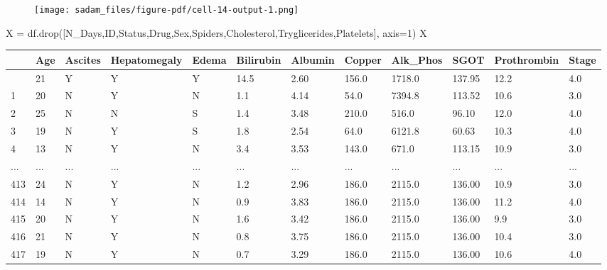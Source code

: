 \documentclass[
  letterpaper,
]{krantz}
\makeatletter
\newenvironment{Shaded}{\begin{snugshade}}{\end{snugshade}}
\newcommand{\DecValTok}[1]{\textcolor[rgb]{0.68,0.00,0.00}{#1}}
\newcommand{\NormalTok}[1]{\textcolor[rgb]{0.00,0.23,0.31}{#1}}
\newcommand{\OperatorTok}[1]{\textcolor[rgb]{0.37,0.37,0.37}{#1}}
\newcommand{\StringTok}[1]{\textcolor[rgb]{0.13,0.47,0.30}{#1}}
\newenvironment{kframe}{%
\medskip{}
\setlength{\fboxsep}{.8em}
 \def\at@end@of@kframe{}%
 \ifinner\ifhmode%
  \def\at@end@of@kframe{\end{minipage}}%
  \begin{minipage}{\columnwidth}%
 \fi\fi%
 \def\FrameCommand##1{\hskip\@totalleftmargin \hskip-\fboxsep
 \colorbox{shadecolor}{##1}\hskip-\fboxsep
     \hskip-\linewidth \hskip-\@totalleftmargin \hskip\columnwidth}%
 \MakeFramed {\advance\hsize-\width
   \@totalleftmargin\z@ \linewidth\hsize
   \@setminipage}}%
 {\par\unskip\endMakeFramed%
 \at@end@of@kframe}
\renewenvironment{Shaded}{\begin{kframe}}{\end{kframe}}
\makeatother
\begin{document}
\begin{figure}[H]

{\centering \texttt{[image: sadam\_files/figure-pdf/cell-14-output-1.png]}

}

\end{figure}

\begin{Shaded}
\begin{Highlighting}[]
\NormalTok{X }\OperatorTok{=}\NormalTok{ df.drop([}\StringTok{\textquotesingle{}N\_Days\textquotesingle{}}\NormalTok{,}\StringTok{\textquotesingle{}ID\textquotesingle{}}\NormalTok{,}\StringTok{\textquotesingle{}Status\textquotesingle{}}\NormalTok{,}\StringTok{\textquotesingle{}Drug\textquotesingle{}}\NormalTok{,}\StringTok{\textquotesingle{}Sex\textquotesingle{}}\NormalTok{,}\StringTok{\textquotesingle{}Spiders\textquotesingle{}}\NormalTok{,}\StringTok{\textquotesingle{}Cholesterol\textquotesingle{}}\NormalTok{,}\StringTok{\textquotesingle{}Tryglicerides\textquotesingle{}}\NormalTok{,}\StringTok{\textquotesingle{}Platelets\textquotesingle{}}\NormalTok{], axis}\OperatorTok{=}\DecValTok{1}\NormalTok{)}
\NormalTok{X}
\end{Highlighting}
\end{Shaded}

\begin{longtable}[]{@{}llllllllllll@{}}
\toprule\noalign{}
& Age & Ascites & Hepatomegaly & Edema & Bilirubin & Albumin & Copper &
Alk\_Phos & SGOT & Prothrombin & Stage \\
\midrule\noalign{}
\endhead
\bottomrule\noalign{}
\endlastfoot
0 & 21 & Y & Y & Y & 14.5 & 2.60 & 156.0 & 1718.0 & 137.95 & 12.2 &
4.0 \\
1 & 20 & N & Y & N & 1.1 & 4.14 & 54.0 & 7394.8 & 113.52 & 10.6 & 3.0 \\
2 & 25 & N & N & S & 1.4 & 3.48 & 210.0 & 516.0 & 96.10 & 12.0 & 4.0 \\
3 & 19 & N & Y & S & 1.8 & 2.54 & 64.0 & 6121.8 & 60.63 & 10.3 & 4.0 \\
4 & 13 & N & Y & N & 3.4 & 3.53 & 143.0 & 671.0 & 113.15 & 10.9 & 3.0 \\
... & ... & ... & ... & ... & ... & ... & ... & ... & ... & ... & ... \\
413 & 24 & N & Y & N & 1.2 & 2.96 & 186.0 & 2115.0 & 136.00 & 10.9 &
3.0 \\
414 & 14 & N & Y & N & 0.9 & 3.83 & 186.0 & 2115.0 & 136.00 & 11.2 &
4.0 \\
415 & 20 & N & Y & N & 1.6 & 3.42 & 186.0 & 2115.0 & 136.00 & 9.9 &
3.0 \\
416 & 21 & N & Y & N & 0.8 & 3.75 & 186.0 & 2115.0 & 136.00 & 10.4 &
3.0 \\
417 & 19 & N & Y & N & 0.7 & 3.29 & 186.0 & 2115.0 & 136.00 & 10.6 &
4.0 \\
\end{longtable}
\end{document}
